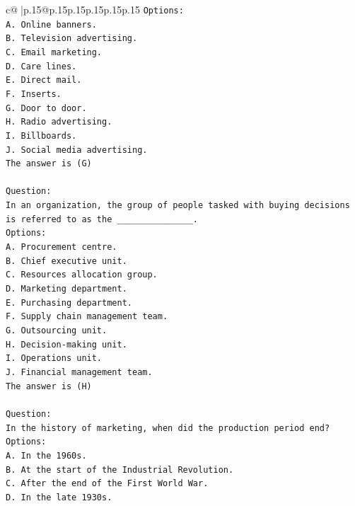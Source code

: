\documentclass{article}
\begin{document}
{\begin{supertabular}{c@{$\;$}|p{.15\linewidth}@{}p{.15\linewidth}p{.15\linewidth}p{.15\linewidth}p{.15\linewidth}p{.15\linewidth}}
{{{\texttt{Options:} \\
\texttt{A. Online banners.} \\
\texttt{B. Television advertising.} \\
\texttt{C. Email marketing.} \\
\texttt{D. Care lines.} \\
\texttt{E. Direct mail.} \\
\texttt{F. Inserts.} \\
\texttt{G. Door to door.} \\
\texttt{H. Radio advertising.} \\
\texttt{I. Billboards.} \\
\texttt{J. Social media advertising.} \\
\texttt{The answer is (G)} \\
\\ 
\texttt{Question:} \\
\texttt{In an organization, the group of people tasked with buying decisions is referred to as the \_\_\_\_\_\_\_\_\_\_\_\_\_\_\_.} \\
\texttt{Options:} \\
\texttt{A. Procurement centre.} \\
\texttt{B. Chief executive unit.} \\
\texttt{C. Resources allocation group.} \\
\texttt{D. Marketing department.} \\
\texttt{E. Purchasing department.} \\
\texttt{F. Supply chain management team.} \\
\texttt{G. Outsourcing unit.} \\
\texttt{H. Decision{-}making unit.} \\
\texttt{I. Operations unit.} \\
\texttt{J. Financial management team.} \\
\texttt{The answer is (H)} \\
\\ 
\texttt{Question:} \\
\texttt{In the history of marketing, when did the production period end?} \\
\texttt{Options:} \\
\texttt{A. In the 1960s.} \\
\texttt{B. At the start of the Industrial Revolution.} \\
\texttt{C. After the end of the First World War.} \\
\texttt{D. In the late 1930s.} \\
}}}
\end{supertabular}}
\end{document}
